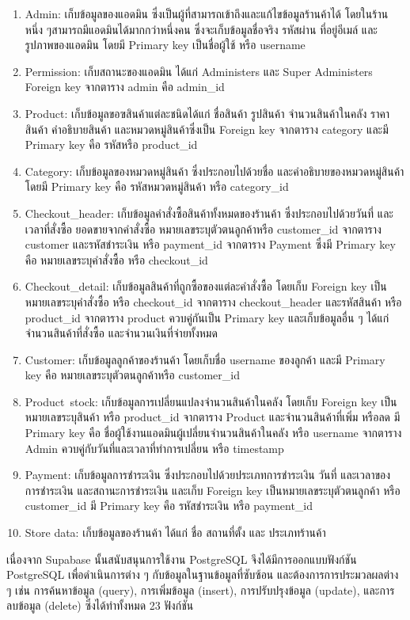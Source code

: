 \begin{enumerate}
  \item Admin: เก็บข้อมูลของแอดมิน ซึ่งเป็นผู้ที่สามารถเข้าถึงและแก้ไขข้อมูลร้านค้าได้ โดยในร้านหนึ่ง ๆสามารถมีแอดมินได้มากกว่าหนึ่งคน ซึ่งจะเก็บข้อมูลชื่อจริง รหัสผ่าน ที่อยู่อีเมล์ และรูปภาพของแอดมิน โดยมี Primary key เป็นชื่อผู้ใช้ หรือ username
  \item Permission: เก็บสถานะของแอดมิน ได้แก่ Administers และ Super Administers Foreign key จากตาราง admin คือ admin\_id
  \item Product: เก็บข้อมูลขอฃสินค้าแต่ละชนิดได้แก่ ชื่อสินค้า รูปสินค้า จำนวนสินค้าในคลัง ราคาสินค้า คำอธิบายสินค้า และหมวดหมู่สินค้าซึ่งเป็น Foreign key จากตาราง category และมี Primary key คือ รหัสหรือ product\_id
  \item Category: เก็บข้อมูลของหมวดหมู่สินค้า ซึ่งประกอบไปด้วยชื่อ และคำอธิบายของหมวดหมู่สินค้า โดยมี Primary key คือ รหัสหมวดหมู่สินค้า หรือ category\_id
  \item Checkout\_header: เก็บข้อมูลคำสั่งซื้อสินค้าทั้งหมดของร้านค้า ซึ่งประกอบไปด้วยวันที่ และเวลาที่สั่งซื้อ ยอดขายจากคำสั่งซื้อ หมายเลขระบุตัวตนลูกค้าหรือ customer\_id จากตาราง customer และรหัสชำระเงิน หรือ payment\_id  จากตาราง Payment ซึ่งมี Primary key คือ หมายเลขระบุคำสั่งซื้อ หรือ checkout\_id
  \item Checkout\_detail: เก็บข้อมูลสินค้าที่ถูกซื้อของแต่ละคำสั่งซื้อ โดยเก็บ Foreign key เป็นหมายเลขระบุคำสั่งซื้อ หรือ checkout\_id จากตาราง checkout\_header และรหัสสินค้า หรือ product\_id จากตาราง product ควบคู่กันเป็น Primary key และเก็บข้อมูลอื่น ๆ ได้แก่ จำนวนสินค้าที่สั่งซื้อ และจำนวนเงินที่จ่ายทั้งหมด
  \item Customer: เก็บข้อมูลลูกค้าของร้านค้า โดยเก็บชื่อ username ของลูกค้า และมี Primary key คือ หมายเลขระบุตัวตนลูกค้าหรือ customer\_id
  \item Product\ stock: เก็บข้อมูลการเปลี่ยนแปลงจำนวนสินค้าในคลัง โดยเก็บ Foreign key เป็นหมายเลขระบุสินค้า หรือ product\_id จากตาราง Product และจำนวนสินค้าที่เพิ่ม หรือลด มี Primary key คือ ชื่อผู้ใช้งานแอดมินผู้เปลี่ยนจำนวนสินค้าในคลัง หรือ username จากตาราง Admin ควบคู่กับวันที่และเวลาที่ทำการเปลี่ยน หรือ timestamp
  \item Payment: เก็บข้อมูลการชำระเงิน ซึ่งประกอบไปด้วยประเภทการชำระเงิน วันที่ และเวลาของการชำระเงิน และสถานะการชำระเงิน และเก็บ Foreign key เป็นหมายเลขระบุตัวตนลูกค้า หรือ customer\_id  มี Primary key คือ รหัสชำระเงิน หรือ payment\_id
  \item Store data: เก็บข้อมูลของร้านค้า ได้แก่ ชื่อ สถานที่ตั้ง และ ประเภทร้านค้า

\end{enumerate}
เนื่องจาก Supabase นั้นสนับสนุนการใช้งาน PostgreSQL จึงได้มีการออกแบบฟังก์ชัน PostgreSQL เพื่อดำเนินการต่าง ๆ กับข้อมูลในฐานข้อมูลที่ซับซ้อน และต้องการการประมวลผลต่าง ๆ เช่น การค้นหาข้อมูล (query), การเพิ่มข้อมูล (insert), การปรับปรุงข้อมูล (update), และการลบข้อมูล (delete) ซึ่งได้ทำทั้งหมด 23 ฟังก์ชัน



